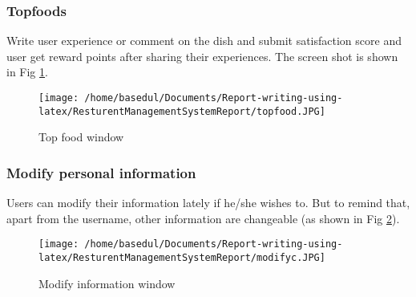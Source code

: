 \documentclass[12pt,a4paper]{article}
\newcommand\tab[1][1cm]{\hspace*{#1}}
\begin{document}
		\subsubsection{Topfoods}
			\tab Write user experience or comment on the dish and submit satisfaction score and user get reward points after sharing their experiences. The screen shot is shown in Fig \ref{fig:topfood}. 
			\begin{figure}[H]
		\centering
		\texttt{[image: /home/basedul/Documents/Report-writing-using-latex/ResturentManagementSystemReport/topfood.JPG]}
		\caption{Top food window}
		\label{fig:topfood} 
		\end{figure}
		
		
		\subsubsection{Modify personal information}
	\tab Users can modify their information lately if he/she wishes to. But to remind that, apart from the username, other information are changeable (as shown in Fig \ref{fig:madmin}).
	
			\begin{figure}[H]
		\centering
		\texttt{[image: /home/basedul/Documents/Report-writing-using-latex/ResturentManagementSystemReport/modifyc.JPG]}
		\caption{Modify information window}
		\label{fig:madmin} 
%		
%		
%		
%		
		\end{figure}	
						
		
\end{document}
